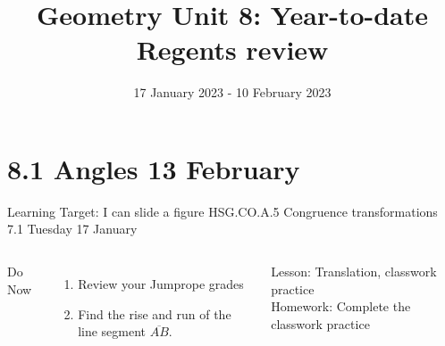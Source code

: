 

\newcommand\ticks{}
  \def\ticks{{Bar[scale=2]}-{Bar[scale=2]}}
\newcommand\paraticks{}
  \def\paraticks{{Straight Barb[reversed, scale=2]}-{Straight Barb[scale=2]}}

\title{Geometry Unit 8: Year-to-date Regents review}
\date{17 January 2023 - 10 February 2023}


\frame{\titlepage}
\section[Outline]{}
\frame{\tableofcontents}

\section{8.1 Angles \hfill 13 February \,}
\begin{frame}{Learning Target: I can slide a figure}
  {HSG.CO.A.5 Congruence transformations \hfill \alert{7.1 Tuesday 17 January}}
  \begin{columns}
    Do Now
    \begin{enumerate}
      \item Review your Jumprope grades
      \item Find the rise and run of the line segment $\overline{AB}$.
    \end{enumerate}
    Lesson: Translation, classwork practice \\
    Homework: Complete the classwork practice
    \begin{flushright}
    \end{flushright}
  \end{columns}
\end{frame}

